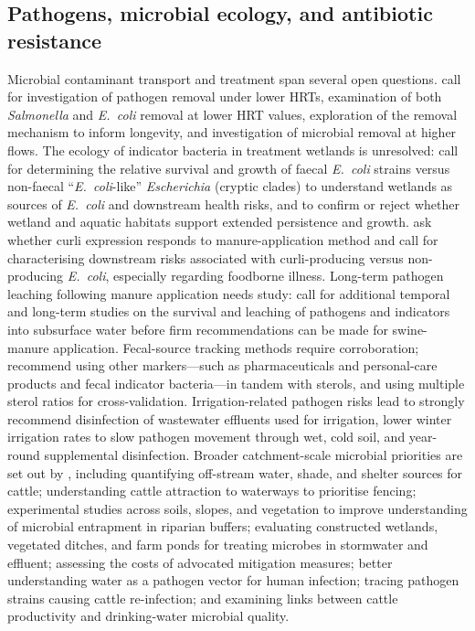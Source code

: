 \documentclass[11pt]{article}
\begin{document}
\subsection{Pathogens, microbial ecology, and antibiotic resistance}
Microbial contaminant transport and treatment span several open questions. \textcite{Soupir2018} call for investigation of pathogen removal under lower HRTs, examination of both \textit{Salmonella} and \textit{E.\ coli} removal at lower HRT values, exploration of the removal mechanism to inform longevity, and investigation of microbial removal at higher flows. The ecology of indicator bacteria in treatment wetlands is unresolved: \textcite{Stott2023} call for determining the relative survival and growth of faecal \textit{E.\ coli} strains versus non-faecal ``\textit{E.\ coli}-like'' \textit{Escherichia} (cryptic clades) to understand wetlands as sources of \textit{E.\ coli} and downstream health risks, and to confirm or reject whether wetland and aquatic habitats support extended persistence and growth. \textcite{Truhlar2015} ask whether curli expression responds to manure-application method and call for characterising downstream risks associated with curli-producing versus non-producing \textit{E.\ coli}, especially regarding foodborne illness. Long-term pathogen leaching following manure application needs study: \textcite{Malik2004} call for additional temporal and long-term studies on the survival and leaching of pathogens and indicators into subsurface water before firm recommendations can be made for swine-manure application. Fecal-source tracking methods require corroboration; \textcite{Gottschall2013} recommend using other markers---such as pharmaceuticals and personal-care products and fecal indicator bacteria---in tandem with sterols, and using multiple sterol ratios for cross-validation. Irrigation-related pathogen risks lead \textcite{Ding2021} to strongly recommend disinfection of wastewater effluents used for irrigation, lower winter irrigation rates to slow pathogen movement through wet, cold soil, and year-round supplemental disinfection. Broader catchment-scale microbial priorities are set out by \textcite{Collins2007}, including quantifying off-stream water, shade, and shelter sources for cattle; understanding cattle attraction to waterways to prioritise fencing; experimental studies across soils, slopes, and vegetation to improve understanding of microbial entrapment in riparian buffers; evaluating constructed wetlands, vegetated ditches, and farm ponds for treating microbes in stormwater and effluent; assessing the costs of advocated mitigation measures; better understanding water as a pathogen vector for human infection; tracing pathogen strains causing cattle re-infection; and examining links between cattle productivity and drinking-water microbial quality.
\end{document}
